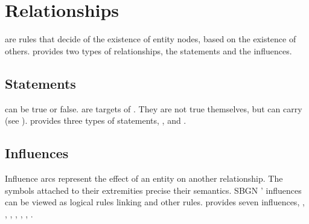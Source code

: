
\section{Relationships}\label{sec:relationships}

 are rules that decide of the existence of entity nodes, based on the existence of others. 
\SBGNERLone{} provides two types of relationships, the statements and the influences.


\subsection{Statements}\label{sec:statements}

 can be true or false.  are targets of . They are not true themselves, but can  carry  (see ). \SBGNERLone{} provides three types of statements, ,  and .





\subsection{Influences}\label{sec:influences}

Influence arcs represent the effect of an entity on another relationship. The symbols attached to their extremities precise their semantics. SBGN \ERs{}' influences can be viewed as logical rules linking  and other rules. \SBGNERLone{} provides seven influences, , , , , , , .











%

